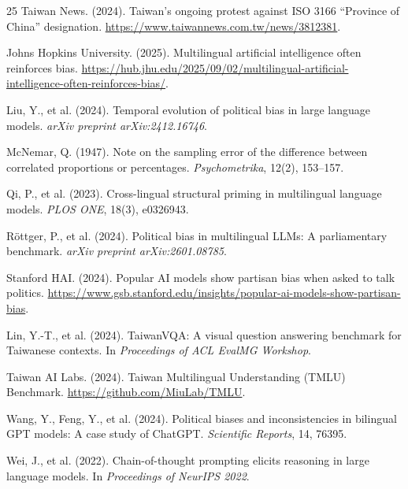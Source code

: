 \documentclass[11pt,a4paper]{article}
\begin{document}
\begin{thebibliography}{25}
Taiwan News. (2024).
\newblock Taiwan's ongoing protest against ISO 3166 ``Province of China'' designation.
\newblock \url{https://www.taiwannews.com.tw/news/3812381}.

Johns Hopkins University. (2025).
\newblock Multilingual artificial intelligence often reinforces bias.
\newblock \url{https://hub.jhu.edu/2025/09/02/multilingual-artificial-intelligence-often-reinforces-bias/}.

Liu, Y., et al. (2024).
\newblock Temporal evolution of political bias in large language models.
\newblock \textit{arXiv preprint arXiv:2412.16746}.

McNemar, Q. (1947).
\newblock Note on the sampling error of the difference between correlated proportions or percentages.
\newblock \textit{Psychometrika}, 12(2), 153--157.

Qi, P., et al. (2023).
\newblock Cross-lingual structural priming in multilingual language models.
\newblock \textit{PLOS ONE}, 18(3), e0326943.

Röttger, P., et al. (2024).
\newblock Political bias in multilingual LLMs: A parliamentary benchmark.
\newblock \textit{arXiv preprint arXiv:2601.08785}.

Stanford HAI. (2024).
\newblock Popular AI models show partisan bias when asked to talk politics.
\newblock \url{https://www.gsb.stanford.edu/insights/popular-ai-models-show-partisan-bias}.

Lin, Y.-T., et al. (2024).
\newblock TaiwanVQA: A visual question answering benchmark for Taiwanese contexts.
\newblock In \textit{Proceedings of ACL EvalMG Workshop}.

Taiwan AI Labs. (2024).
\newblock Taiwan Multilingual Understanding (TMLU) Benchmark.
\newblock \url{https://github.com/MiuLab/TMLU}.

Wang, Y., Feng, Y., et al. (2024).
\newblock Political biases and inconsistencies in bilingual GPT models: A case study of ChatGPT.
\newblock \textit{Scientific Reports}, 14, 76395.

Wei, J., et al. (2022).
\newblock Chain-of-thought prompting elicits reasoning in large language models.
\newblock In \textit{Proceedings of NeurIPS 2022}.


\end{thebibliography}
\end{document}
